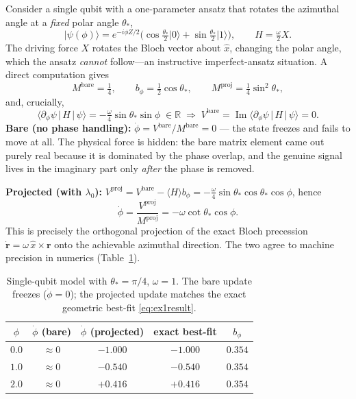 \documentclass[12pt,a4paper]{article}
\newcommand{\ket}[1]{\lvert #1 \rangle}
\newcommand{\mel}[3]{\langle #1 \,|\, #2 \,|\, #3 \rangle}
\newcommand{\im}{\operatorname{Im}}
\begin{document}
Consider a single qubit with a one-parameter ansatz that rotates the azimuthal angle at a
\emph{fixed} polar angle $\theta_\ast$,
\begin{equation}
  \ket{\psi(\phi)}=e^{-i\phi Z/2}\big(\cos\tfrac{\theta_\ast}{2}\ket{0}+\sin\tfrac{\theta_\ast}{2}\ket{1}\big),
  \qquad H=\tfrac{\omega}{2}X .
\end{equation}
The driving force $X$ rotates the Bloch vector about $\hat x$, changing the polar angle, which the
ansatz \emph{cannot} follow---an instructive imperfect-ansatz situation. A direct computation gives
\[
  M^{\text{bare}}=\tfrac14,\qquad
  b_\phi=\tfrac12\cos\theta_\ast,\qquad
  M^{\text{proj}}=\tfrac14\sin^2\theta_\ast,
\]
and, crucially,
\[
  \mel{\partial_\phi\psi}{H}{\psi}=-\tfrac{\omega}{4}\sin\theta_\ast\sin\phi\;\in\mathbb{R}
  \;\Longrightarrow\;
  V^{\text{bare}}=\im\mel{\partial_\phi\psi}{H}{\psi}=0 .
\]
\textbf{Bare (no phase handling):} $\dot\phi=V^{\text{bare}}/M^{\text{bare}}=0$ --- the state freezes
and fails to move at all. The physical force is hidden: the bare matrix element came out purely real
because it is dominated by the phase overlap, and the genuine signal lives in the imaginary part only
\emph{after} the phase is removed.

\textbf{Projected (with $\lambda_0$):} $V^{\text{proj}}=V^{\text{bare}}-\langle H\rangle b_\phi
=-\tfrac{\omega}{4}\sin\theta_\ast\cos\theta_\ast\cos\phi$, hence
\begin{equation}
  \dot\phi=\frac{V^{\text{proj}}}{M^{\text{proj}}}=-\omega\cot\theta_\ast\cos\phi .
  \label{eq:ex1result}
\end{equation}
This is precisely the orthogonal projection of the exact Bloch precession
$\dot{\mathbf r}=\omega\,\hat x\times\mathbf r$ onto the achievable azimuthal direction. The two
agree to machine precision in numerics (Table~\ref{tab:ex1}).

\begin{table}[h]
\centering
\renewcommand{\arraystretch}{1.25}
\begin{tabular}{ccccc}
\toprule
$\phi$ & $\dot\phi$ (bare) & $\dot\phi$ (projected) & exact best-fit & $b_\phi$ \\
\midrule
$0.0$ & $\approx 0$ & $-1.000$ & $-1.000$ & $0.354$ \\
$1.0$ & $\approx 0$ & $-0.540$ & $-0.540$ & $0.354$ \\
$2.0$ & $\approx 0$ & $+0.416$ & $+0.416$ & $0.354$ \\
\bottomrule
\end{tabular}
\caption{Single-qubit model with $\theta_\ast=\pi/4$, $\omega=1$. The bare update freezes
($\dot\phi=0$); the projected update matches the exact geometric best-fit \eqref{eq:ex1result}.}
\label{tab:ex1}
\end{table}
\end{document}
